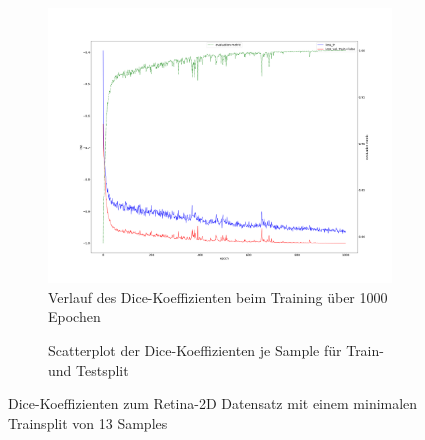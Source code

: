 \begin{figure}[H]
\centering
\begin{minipage}{.6\textwidth}
\begin{subfigure}{\textwidth}
\centering
\includegraphics[width=\textwidth]{Pictures/nnUnet/Praxis/Task205-Augen-minimal-13-trainsamples/progress_205-Augen-minimal-13-trainsamples.png}
\caption{Verlauf des Dice-Koeffizienten beim Training über 1000 Epochen}
\label{pic:Prog_205}
\end{subfigure}
\end{minipage}%
\begin{minipage}{.4\textwidth}
\begin{subfigure}{\textwidth}

\caption{Scatterplot der Dice-Koeffizienten je Sample für Train- und Testsplit}
\label{pic:Dice_205}
\end{subfigure}
\end{minipage}

\caption{Dice-Koeffizienten zum Retina-2D Datensatz mit einem minimalen Trainsplit von 13 Samples}
\end{figure}


